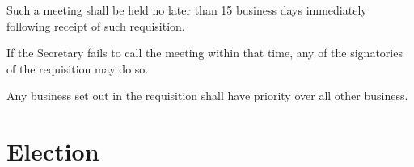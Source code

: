 \documentclass[a4paper]{article}
\begin{document}
\begin{myEnumerate}
\begin{myEnumerate}
            \item Such a meeting shall be held no later than 15 business days immediately following receipt of such requisition.
                \begin{myEnumerate}
                    \item If the Secretary fails to call the meeting within that time, any of the signatories of the requisition may do so.
                \end{myEnumerate}
            \item \label{item:sgm_priority} Any business set out in the requisition shall have priority over all other business.
        \end{myEnumerate}
\end{myEnumerate}


\section{Election} \label{sec:elections}
\end{document}
